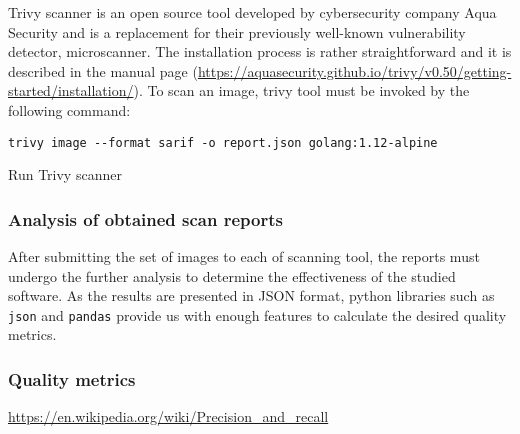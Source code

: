 Trivy scanner is an open source tool developed by cybersecurity company Aqua Security and is a replacement for their previously well-known vulnerability detector, microscanner. The installation process is rather straightforward and it is described in the manual page (\url{https://aquasecurity.github.io/trivy/v0.50/getting-started/installation/}). To scan an image, trivy tool must be invoked by the following command:

\begin{listing}[htp]
    \centering
    \begin{minipage}{0.8\linewidth}
        \begin{verbatim}
trivy image --format sarif -o report.json golang:1.12-alpine
        \end{verbatim}
    \end{minipage}
    \caption{Run Trivy scanner}
    \label{lst:trivy}
\end{listing}


\subsubsection{Analysis of obtained scan reports}

After submitting the set of images to each of scanning tool, the reports must undergo the further analysis to determine the effectiveness of the studied software. As the results are presented in JSON format, python libraries such as \texttt{json} and \texttt{pandas} provide us with enough features to calculate the desired quality metrics. 

\subsubsection*{Quality metrics}



\url{https://en.wikipedia.org/wiki/Precision_and_recall}